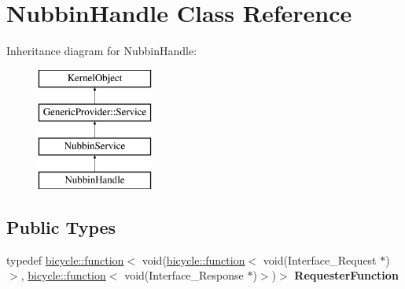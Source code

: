 \hypertarget{class_nubbin_handle}{}\section{Nubbin\+Handle Class Reference}
\label{class_nubbin_handle}
Inheritance diagram for Nubbin\+Handle\+:\begin{figure}[H]
\begin{center}
\leavevmode
\includegraphics[height=4.000000cm]{class_nubbin_handle}
\end{center}
\end{figure}
\subsection*{Public Types}
\begin{DoxyCompactItemize}
\item 
\mbox{\label{class_nubbin_handle_a4f0e80d0edcf259618d4d8f201315dc1}} 
typedef \hyperlink{classbicycle_1_1function}{bicycle\+::function}$<$ void(\hyperlink{classbicycle_1_1function}{bicycle\+::function}$<$ void(Interface\+\_\+\+Request $\ast$)$>$, \hyperlink{classbicycle_1_1function}{bicycle\+::function}$<$ void(Interface\+\_\+\+Response $\ast$)$>$)$>$ {\bfseries Requester\+Function}
\end{DoxyCompactItemize}
